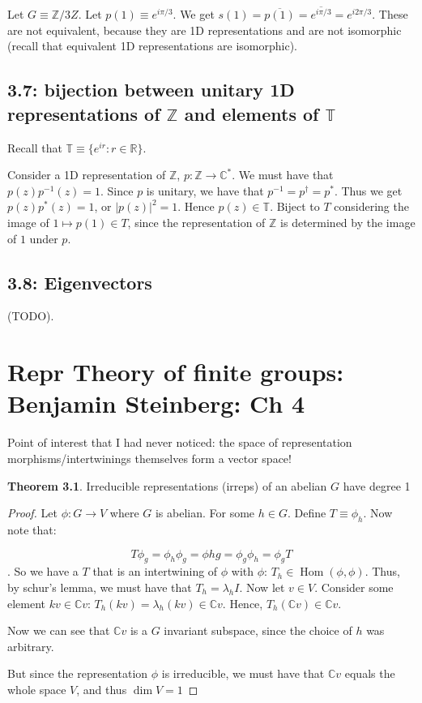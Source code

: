 \documentclass{book}
\newcommand{\Hom}{\operatorname{Hom}}
\newcommand{\Z}{\ensuremath{\mathbb{Z}}}
\newcommand{\T}{\ensuremath{\mathbb{T}}}
\newcommand{\C}{\ensuremath{\mathbb{C}}}
\newcommand{\Cstar}{\ensuremath{\mathbb{C}^*}}
\newcommand{\R}{\ensuremath{\mathbb{R}}}
\theoremstyle{definition}
\newtheorem{theorem}{Theorem}
\begin{document}
Let $G \equiv \mathbb Z/3Z$. Let $p(1) \equiv e^{i\pi/3}$. We get $s(1) = \overline{p(1)} = \overline{e^{i \pi/3}} = e^{i 2 \pi/3}$.
These are not equivalent, because they are 1D representations and are not
isomorphic (recall that equivalent 1D representations are isomorphic).

\section{3.7: bijection between unitary 1D representations of $\Z$ and elements of $\T$}

Recall that $\T \equiv \{ e^{ir} : r \in \R \}$.

Consider a 1D representation of $\Z$, $p: \Z \rightarrow \Cstar$.
We must have that $p(z) p^{-1}(z) = 1$. Since $p$ is unitary, we have that $p^{-1} = p^\dagger = p^*$.
Thus we get $p(z)p^*(z) = 1$, or $|p(z)|^2 = 1$. Hence $p(z) \in \T$. Biject
to $T$ considering the image of $1 \mapsto p(1) \in T$, since the representation of $\Z$
is determined by the image of $1$ under $p$.

\section{3.8: Eigenvectors}
(TODO).

\chapter{Repr Theory of finite groups: Benjamin Steinberg: Ch 4}

Point of interest that I had never noticed: the space of representation morphisms/intertwinings
themselves form a vector space!

\begin{theorem}
Irreducible representations (irreps) of an abelian $G$ have degree 1 
\end{theorem}
\begin{proof}
Let $\phi: G \rightarrow V$ where $G$ is abelian.
For some $h \in G$. Define $T \equiv \phi_h$. Now note that:

$$ T \phi_g = \phi_h \phi_g = \phi{hg} = \phi_g \phi_h = \phi_g T $$. So we have
a $T$ that is an intertwining of $\phi$ with $\phi$: $T_h \in \Hom(\phi, \phi)$.
Thus, by schur's lemma, we must have that $T_h = \lambda_h I$. Now let $v \in V$.
Consider some element $kv \in \C v$: $T_h(kv) = \lambda_h (kv) \in \C v$.
Hence, $T_h(\C v) \in \C v$.  

Now we can see that $\C v$ is a $G$ invariant subspace, since the choice of $h$
was arbitrary.

But since the representation $\phi$ is irreducible, we must have that $\C v$
equals the whole space $V$, and thus $\dim V = 1$

\end{proof}
\end{document}
